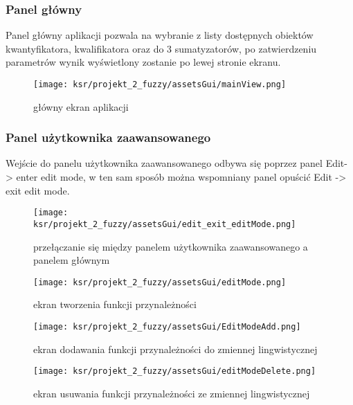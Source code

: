\documentclass{article}
\begin{document}
\subsubsection{Panel główny}

\noindent Panel główny aplikacji pozwala na wybranie z listy dostępnych obiektów kwantyfikatora, kwalifikatora oraz do 3 sumatyzatorów, po zatwierdzeniu parametrów wynik wyświetlony zostanie po lewej stronie ekranu.

\begin{figure}[H]
\centering
\texttt{[image: ksr/projekt\_2\_fuzzy/assetsGui/mainView.png]}
\caption{główny ekran aplikacji}
\label{fig:epsilon_bat}
\end{figure}

\subsubsection{Panel użytkownika zaawansowanego}

\noindent Wejście do panelu użytkownika zaawansowanego odbywa się poprzez panel Edit-> enter edit mode, w ten sam sposób można wspomniany panel opuścić Edit -> exit edit mode.

\begin{figure}[H]
\centering
\texttt{[image: ksr/projekt\_2\_fuzzy/assetsGui/edit\_exit\_editMode.png]}
\caption{przełączanie się między panelem użytkownika zaawansowanego a panelem głównym}
\label{fig:epsilon_bat}
\end{figure}

\begin{figure}[H]
  \begin{minipage}[b]{0.3\linewidth}
    \centering
    \texttt{[image: ksr/projekt\_2\_fuzzy/assetsGui/editMode.png]}
    \caption{ekran tworzenia funkcji przynależności}
  \end{minipage}
  \hfill
  \begin{minipage}[b]{0.3\linewidth}
    \centering
    \texttt{[image: ksr/projekt\_2\_fuzzy/assetsGui/EditModeAdd.png]}
    \caption{ekran dodawania funkcji przynależności do zmiennej lingwistycznej}
  \end{minipage}
  \hfill
  \begin{minipage}[b]{0.3\linewidth}
    \centering
    \texttt{[image: ksr/projekt\_2\_fuzzy/assetsGui/editModeDelete.png]}
    \caption{ekran usuwania funkcji przynależności ze zmiennej lingwistycznej}
  \end{minipage}
\end{figure}
\end{document}

